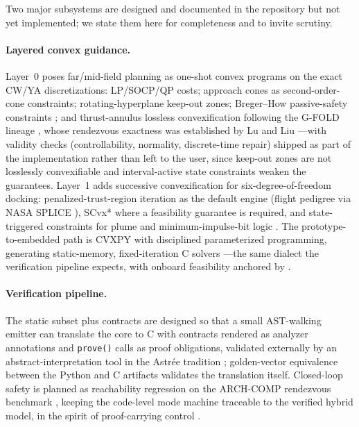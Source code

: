 \documentclass[11pt]{article}
\begin{document}
Two major subsystems are designed and documented in the repository but not
yet implemented; we state them here for completeness and to invite
scrutiny.

\paragraph{Layered convex guidance.} Layer~0 poses far/mid-field planning
as one-shot convex programs on the exact CW/YA discretizations: LP/SOCP/QP
costs; approach cones as second-order-cone constraints; rotating-hyperplane
keep-out zones; Breger--How passive-safety constraints \cite{breger2008};
and thrust-annulus lossless convexification following the G-FOLD lineage
\cite{acikmese2007,acikmese2011}, whose rendezvous exactness was
established by Lu and Liu \cite{lu2013}---with validity checks
(controllability, normality, discrete-time repair) shipped as part of the
implementation rather than left to the user, since keep-out zones are not
losslessly convexifiable \cite{malyuta2022} and interval-active state
constraints weaken the guarantees. Layer~1 adds successive convexification
for six-degree-of-freedom docking: penalized-trust-region iteration
\cite{szmuk2018} as the default engine (flight pedigree via NASA SPLICE
\cite{splice2025}), SCvx* \cite{oguri2023} where a feasibility guarantee is
required, and state-triggered constraints for plume and minimum-impulse-bit
logic \cite{malyuta2020docking}. The prototype-to-embedded path is
CVXPY with disciplined parameterized programming, generating
static-memory, fixed-iteration C solvers \cite{cvxpygen2022}---the same
dialect the verification pipeline expects, with onboard feasibility
anchored by \cite{dueri2017,weiss2015}.

\paragraph{Verification pipeline.} The static subset plus contracts are
designed so that a small AST-walking emitter can translate the core to C
with contracts rendered as analyzer annotations and \texttt{prove()} calls
as proof obligations, validated externally by an abstract-interpretation
tool in the Astr\'ee tradition \cite{kastner2010}; golden-vector
equivalence between the Python and C artifacts validates the translation
itself. Closed-loop safety is planned as reachability regression on the
ARCH-COMP rendezvous benchmark \cite{chan2017}, keeping the code-level mode
machine traceable to the verified hybrid model, in the spirit of
proof-carrying control \cite{feron2013}.
\end{document}
